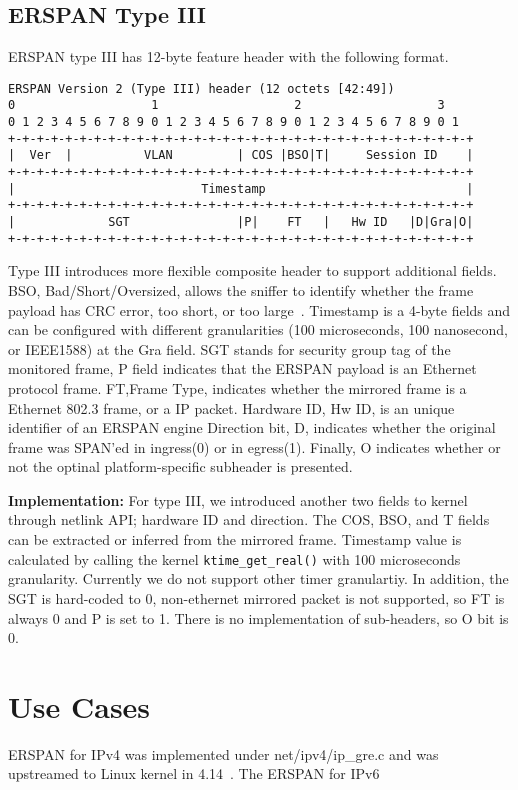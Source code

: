 \documentclass{sigplanconf}
\begin{document}
\subsection{ERSPAN Type III}
ERSPAN type III has 12-byte feature header with the following format.
{\scriptsize
\begin{verbatim}
ERSPAN Version 2 (Type III) header (12 octets [42:49])
0                   1                   2                   3
0 1 2 3 4 5 6 7 8 9 0 1 2 3 4 5 6 7 8 9 0 1 2 3 4 5 6 7 8 9 0 1
+-+-+-+-+-+-+-+-+-+-+-+-+-+-+-+-+-+-+-+-+-+-+-+-+-+-+-+-+-+-+-+-+
|  Ver  |          VLAN         | COS |BSO|T|     Session ID    |
+-+-+-+-+-+-+-+-+-+-+-+-+-+-+-+-+-+-+-+-+-+-+-+-+-+-+-+-+-+-+-+-+
|                          Timestamp                            |
+-+-+-+-+-+-+-+-+-+-+-+-+-+-+-+-+-+-+-+-+-+-+-+-+-+-+-+-+-+-+-+-+
|             SGT               |P|    FT   |   Hw ID   |D|Gra|O|
+-+-+-+-+-+-+-+-+-+-+-+-+-+-+-+-+-+-+-+-+-+-+-+-+-+-+-+-+-+-+-+-+
\end{verbatim}
}
Type III introduces more flexible composite header to support additional
fields.  BSO, Bad/Short/Oversized, allows the sniffer to identify whether
the frame payload has CRC error, too short, or too large~\cite{bso}.
Timestamp is a 4-byte fields and can be configured with different granularities
(100 microseconds, 100 nanosecond, or IEEE1588) at the Gra field.
SGT stands for security group tag of the monitored frame, P field
indicates that the ERSPAN payload is an Ethernet protocol frame.
FT,Frame Type, indicates whether the mirrored frame is a Ethernet
802.3 frame, or a IP packet.
Hardware ID, Hw ID, is an unique identifier of an ERSPAN engine
Direction bit, D, indicates whether the original frame was
SPAN'ed in ingress(0) or in egress(1).
Finally, O indicates whether or not the optinal platform-specific
subheader is presented.

\textbf{Implementation: }
For type III, we introduced another two fields to kernel through
netlink API; hardware ID and direction.
The COS, BSO, and T fields can be extracted or inferred from the mirrored
frame. Timestamp value is calculated by calling the kernel
\texttt{ktime\_get\_real()} with 100 microseconds granularity.
Currently we do not support other timer granulartiy.
In addition, the SGT is hard-coded to 0, non-ethernet mirrored packet
is not supported, so FT is always 0 and P is set to 1.
There is no implementation of sub-headers, so O bit is 0.

\section{Use Cases}
ERSPAN for IPv4 was implemented under net/ipv4/ip\_gre.c and was
upstreamed to Linux kernel in 4.14~\cite{erspanipv4}.
The ERSPAN for IPv6
\end{document}
